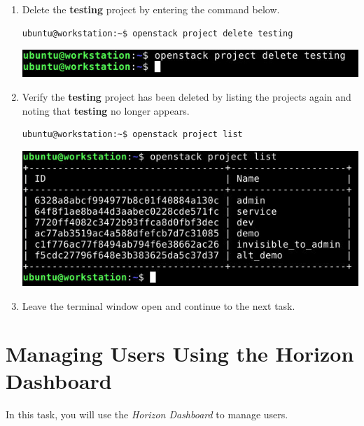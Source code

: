\documentclass[letterpaper, 12pt]{article}
\begin{document}
\begin{enumerate}
    \item Delete the \textbf{testing} project by entering the command below.
\begin{lstlisting}
ubuntu@workstation:~$ openstack project delete testing
\end{lstlisting}

    \begin{center}
        \includegraphics[width=\linewidth]{images/part2/step5.png}
    \end{center}

    \item Verify the \textbf{testing} project has been deleted by listing the projects again and noting that
    \textbf{testing} no longer appears.
\begin{lstlisting}
ubuntu@workstation:~$ openstack project list
\end{lstlisting}

    \begin{center}
        \includegraphics[width=\linewidth]{images/part2/step6.png}
    \end{center}

    \item Leave the terminal window open and continue to the next task.
\end{enumerate}

\section{Managing Users Using the Horizon Dashboard}
\label{sec:managing_users_using_the_horizon_dashboard}
In this task, you will use the \textit{Horizon Dashboard} to manage users.
\end{document}
